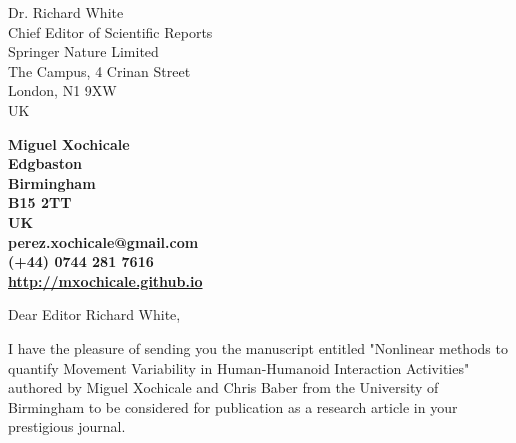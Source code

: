 \documentclass[10pt]{letter}
\begin{document}
\begin{letter}{Dr. Richard White \\
Chief Editor of Scientific Reports \\
Springer Nature Limited \\
The Campus, 4 Crinan Street\\
London, N1 9XW \\
UK
} 

\begin{flushright}
\large\bf Miguel Xochicale \\ %
Edgbaston\\
Birmingham\\
B15 2TT\\
UK\\
\faEnvelopeO  perez.xochicale@gmail.com \\
\faMobile  (+44) 0744 281 7616 \\
\faHome \href{http://mxochicale.github.io}{http://mxochicale.github.io}
\end{flushright} 

\vspace{20pt}
\signature{Miguel Xochicale} %


\opening{Dear Editor Richard White,}

I have the pleasure of sending you the manuscript entitled 
"Nonlinear methods to quantify Movement Variability in Human-Humanoid Interaction Activities"
authored by Miguel Xochicale and Chris Baber from the University of Birmingham to be considered for publication as a research article in your prestigious journal.


\end{letter}
\end{document}
